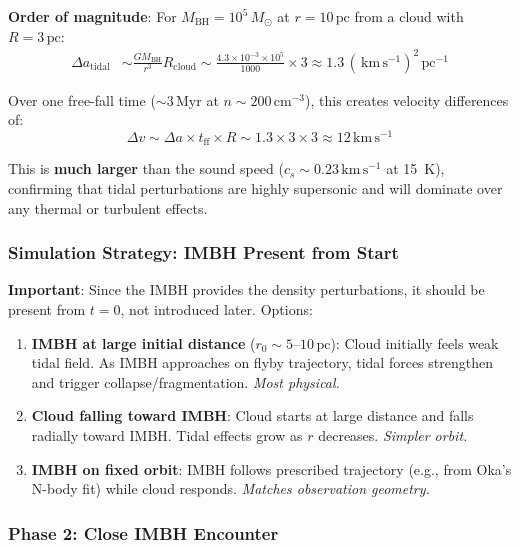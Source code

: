 \documentclass[11pt,a4paper]{article}
\newcommand{\Msun}{M_\odot}
\newcommand{\kms}{\,\mathrm{km\,s^{-1}}}
\newcommand{\pc}{\,\mathrm{pc}}
\newcommand{\cmcubed}{\,\mathrm{cm^{-3}}}
\begin{document}
\textbf{Order of magnitude}:
For $M_\mathrm{BH} = 10^5\,\Msun$ at $r = 10\pc$ from a cloud with $R = 3\pc$:
\begin{align}
    \Delta a_\mathrm{tidal} &\sim \frac{G M_\mathrm{BH}}{r^3} R_\mathrm{cloud}
    \sim \frac{4.3 \times 10^{-3} \times 10^5}{1000} \times 3 \approx 1.3\,(\kms)^2\,\mathrm{pc}^{-1}
\end{align}

Over one free-fall time ($\sim 3\,\mathrm{Myr}$ at $n \sim 200\cmcubed$), this creates velocity differences of:
\begin{equation}
    \Delta v \sim \Delta a \times t_\mathrm{ff} \times R \sim 1.3 \times 3 \times 3 \approx 12\kms
\end{equation}

This is \textbf{much larger} than the sound speed ($c_s \sim 0.23\kms$ at 15~K),
confirming that tidal perturbations are highly supersonic and will dominate over
any thermal or turbulent effects.

\subsubsection{Simulation Strategy: IMBH Present from Start}

\textbf{Important}: Since the IMBH provides the density perturbations, it should be
present from $t = 0$, not introduced later. Options:

\begin{enumerate}
    \item \textbf{IMBH at large initial distance} ($r_0 \sim 5$--$10\pc$): Cloud initially
          feels weak tidal field. As IMBH approaches on flyby trajectory, tidal forces
          strengthen and trigger collapse/fragmentation. \textit{Most physical.}

    \item \textbf{Cloud falling toward IMBH}: Cloud starts at large distance and falls
          radially toward IMBH. Tidal effects grow as $r$ decreases. \textit{Simpler orbit.}

    \item \textbf{IMBH on fixed orbit}: IMBH follows prescribed trajectory (e.g., from
          Oka's N-body fit) while cloud responds. \textit{Matches observation geometry.}
\end{enumerate}

\subsubsection{Phase 2: Close IMBH Encounter}
\end{document}
